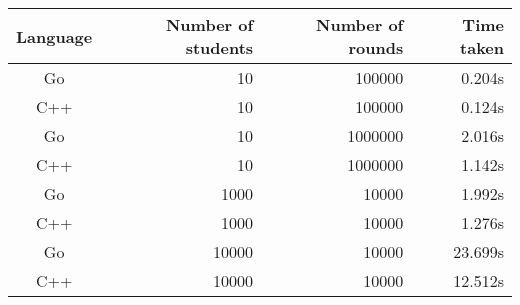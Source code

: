 \documentclass[11pt]{article}
\begin{document}
\begin{tabular}{c r r r}
Language    & Number of students & Number of rounds & Time taken \\
\toprule
Go 			& 10 & 100000 & 0.204s \\
C++         & 10 & 100000 & 0.124s \\
\cmidrule{1-4}
Go 			& 10 & 1000000 & 2.016s \\
C++         & 10 & 1000000 & 1.142s \\
\cmidrule{1-4}
Go 			& 1000 & 10000 & 1.992s \\
C++         & 1000 & 10000 & 1.276s \\
\cmidrule{1-4}
Go 			& 10000 & 10000 & 23.699s \\
C++         & 10000 & 10000 & 12.512s \\
\end{tabular}

\pagebreak
\end{document}
